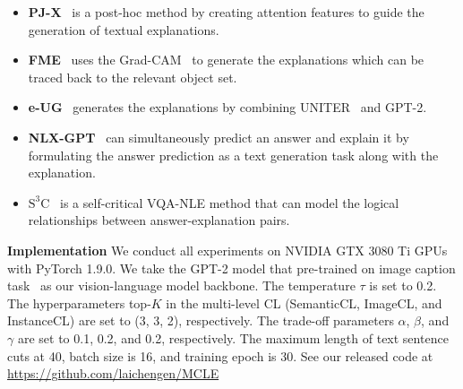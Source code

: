 \documentclass[letterpaper]{article} %
\begin{document}
\begin{itemize}
  \item \textbf{PJ-X}~\cite{park2018multimodal} is a post-hoc method by creating attention features to guide the generation of textual explanations.
  \item \textbf{FME}~\cite{wu2019faithful} uses the Grad-CAM~\cite{selvaraju2017grad} to generate the explanations which can be traced back to the relevant object set.
  \item \textbf{e-UG}~\cite{kayser2021vil} generates the explanations by combining UNITER~\cite{chen2020uniter} and GPT-2.
  \item \textbf{NLX-GPT}~\cite{sammani2022nlx} can simultaneously predict an answer and explain it by formulating the answer prediction as a text generation task along with the explanation.
  \item \textbf{$\text{S}^3\text{C}$}~\cite{suo2023s3c} is a self-critical VQA-NLE method that can model the logical relationships between answer-explanation pairs.
\end{itemize}

\noindent
\textbf{Implementation} We conduct all experiments on NVIDIA GTX 3080 Ti GPUs with PyTorch 1.9.0. We take the GPT-2 model that pre-trained on image caption task~\cite{sammani2022nlx} as our vision-language model backbone. The temperature $\tau$ is set to 0.2. The hyperparameters top-$K$ in the multi-level CL (SemanticCL, ImageCL, and InstanceCL) are set to (3, 3, 2), respectively. The trade-off parameters $\alpha$, $\beta$, and $\gamma$ are set to 0.1, 0.2, and 0.2, respectively. The maximum length of text sentence cuts at 40, batch size is 16, and training epoch is 30. See our released code at  \url{https://github.com/laichengen/MCLE}
\end{document}
